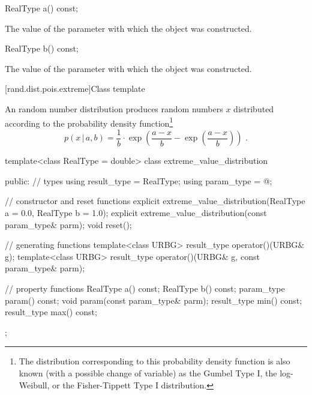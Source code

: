 %
\begin{itemdecl}
RealType a() const;
\end{itemdecl}

\begin{itemdescr}
\pnum\returns The value of the  parameter
 with which the object was constructed.
\end{itemdescr}

%
\begin{itemdecl}
RealType b() const;
\end{itemdecl}

\begin{itemdescr}
\pnum\returns The value of the  parameter
 with which the object was constructed.
\end{itemdescr}


[rand.dist.pois.extreme]{Class template }
%
%

\pnum
An  random number distribution
produces random numbers $x$
distributed according to
the probability density function\footnote{The distribution corresponding to
 this probability density function
 is also known
 (with a possible change of variable)
 as the Gumbel Type I,
 the log-Weibull,
 or the Fisher-Tippett Type I
 distribution.}%
%
\[ p(x\,|\,a,b) = \frac{1}{b}
     \cdot \exp\left(\frac{a-x}{b} - \exp\left(\frac{a-x}{b}\right)\right)
     \text{ .} \]

%
\begin{codeblock}
template<class RealType = double>
  class extreme_value_distribution {
  public:
    // types
    using result_type = RealType;
    using param_type  = @\unspec@;

    // constructor and reset functions
    explicit extreme_value_distribution(RealType a = 0.0, RealType b = 1.0);
    explicit extreme_value_distribution(const param_type& parm);
    void reset();

    // generating functions
    template<class URBG>
      result_type operator()(URBG& g);
    template<class URBG>
      result_type operator()(URBG& g, const param_type& parm);

    // property functions
    RealType a() const;
    RealType b() const;
    param_type param() const;
    void param(const param_type& parm);
    result_type min() const;
    result_type max() const;
  };
\end{codeblock}


